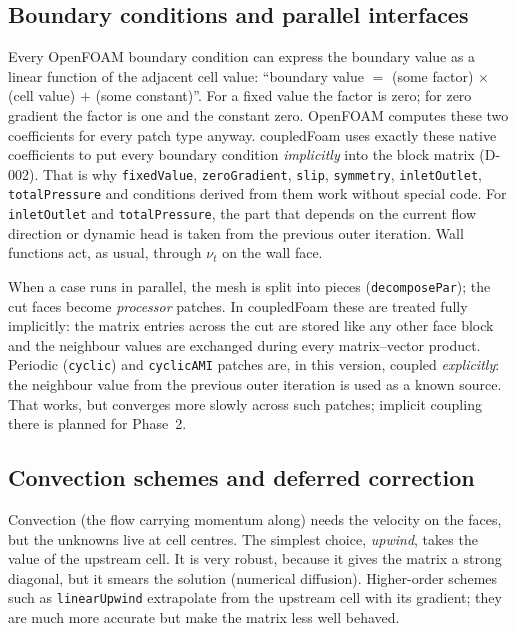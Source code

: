 \documentclass[11pt,a4paper]{article}
\newcommand{\code}[1]{\texttt{#1}}
\begin{document}
\subsection{Boundary conditions and parallel interfaces}\label{sec:bc}

Every OpenFOAM boundary condition can express the boundary value as a
linear function of the adjacent cell value: ``boundary value $=$ (some
factor) $\times$ (cell value) $+$ (some constant)''. For a fixed value the
factor is zero; for zero gradient the factor is one and the constant zero.
OpenFOAM computes these two coefficients for every patch type anyway.
coupledFoam uses exactly these native coefficients to put every boundary
condition \emph{implicitly} into the block matrix (D-002). That is why
\code{fixedValue}, \code{zeroGradient}, \code{slip}, \code{symmetry},
\code{inletOutlet}, \code{totalPressure} and conditions derived from them
work without special code. For \code{inletOutlet} and \code{totalPressure},
the part that depends on the current flow direction or dynamic head is
taken from the previous outer iteration. Wall functions act, as usual,
through $\nu_t$ on the wall face.

When a case runs in parallel, the mesh is split into pieces
(\code{decomposePar}); the cut faces become \emph{processor} patches.
In coupledFoam these are treated fully implicitly: the matrix entries
across the cut are stored like any other face block and the neighbour
values are exchanged during every matrix--vector product. Periodic
(\code{cyclic}) and \code{cyclicAMI} patches are, in this version, coupled
\emph{explicitly}: the neighbour value from the previous outer iteration is
used as a known source. That works, but converges more slowly across such
patches; implicit coupling there is planned for Phase~2.

\subsection{Convection schemes and deferred correction}\label{sec:dc}

Convection (the flow carrying momentum along) needs the velocity on the
faces, but the unknowns live at cell centres. The simplest choice,
\emph{upwind}, takes the value of the upstream cell. It is very robust,
because it gives the matrix a strong diagonal, but it smears the solution
(numerical diffusion). Higher-order schemes such as \code{linearUpwind}
extrapolate from the upstream cell with its gradient; they are much more
accurate but make the matrix less well behaved.
\end{document}

